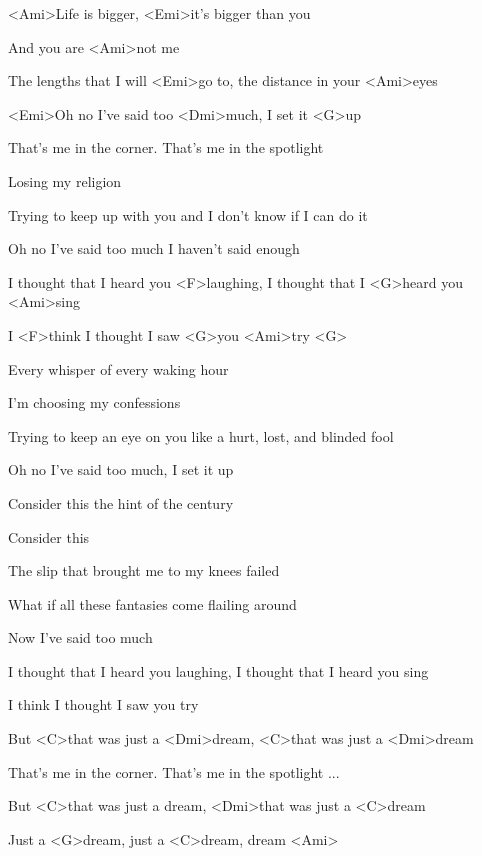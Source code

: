 

\zs
<Ami>Life is bigger,
<Emi>it's bigger than you

And you are <Ami>not me

The lengths that I will <Emi>go to,
the distance in your <Ami>eyes

<Emi>Oh no I've said too <Dmi>much,
I set it <G>up
\ks

\zs
That's me in the corner.
That's me in the spotlight

Losing my religion

Trying to keep up with you
and I don't know if I can do it

Oh no I've said too much
I haven't said enough
\ks

\zr
I thought that I heard you <F>laughing,
I thought that I <G>heard you <Ami>sing

I <F>think I thought I saw <G>you <Ami>try <G>
\kr

\zs
Every whisper
of every waking hour

I'm choosing my confessions

Trying to keep an eye on you
like a hurt, lost, and blinded fool

Oh no I've said too much,
I set it up
\ks

\zs
Consider this
the hint of the century

Consider this

The slip that brought me
to my knees failed

What if all these fantasies
come flailing around

Now I've said too much
\ks

\zr
I thought that I heard you laughing,
I thought that I heard you sing

I think I thought I saw you try
\kr

\zr
But <C>that was just a <Dmi>dream,
<C>that was just a <Dmi>dream
\kr

\zs
That's me in the corner.
That's me in the spotlight ...
\ks

\zr
But <C>that was just a dream,
<Dmi>that was just a <C>dream

Just a <G>dream, just a <C>dream, dream <Ami>
\kr

\kp
